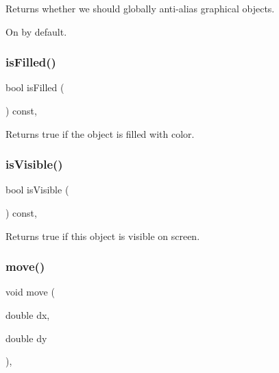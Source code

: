 Returns whether we should globally anti-\/alias graphical objects. 

On by default. \mbox{\label{classGObject_a11c404f106940c201b6f326e0355c150}} 
\subsubsection{\texorpdfstring{is\+Filled()}{isFilled()}}
{\footnotesize\ttfamily bool is\+Filled (\begin{DoxyParamCaption}{ }\end{DoxyParamCaption}) const\hspace{0.3cm}{\ttfamily [virtual]}, {\ttfamily [inherited]}}



Returns {\ttfamily true} if the object is filled with color. 

\mbox{\label{classGObject_a9d8a6cfb13917785c143e74d40e4e2be}} 
\subsubsection{\texorpdfstring{is\+Visible()}{isVisible()}}
{\footnotesize\ttfamily bool is\+Visible (\begin{DoxyParamCaption}{ }\end{DoxyParamCaption}) const\hspace{0.3cm}{\ttfamily [virtual]}, {\ttfamily [inherited]}}



Returns {\ttfamily true} if this object is visible on screen. 

\mbox{\label{classGObject_a5973d8dda83afb36e2c56855515be392}} 
\subsubsection{\texorpdfstring{move()}{move()}}
{\footnotesize\ttfamily void move (\begin{DoxyParamCaption}\item[{double}]{dx,  }\item[{double}]{dy }\end{DoxyParamCaption})\hspace{0.3cm}{\ttfamily [virtual]}, {\ttfamily [inherited]}}



